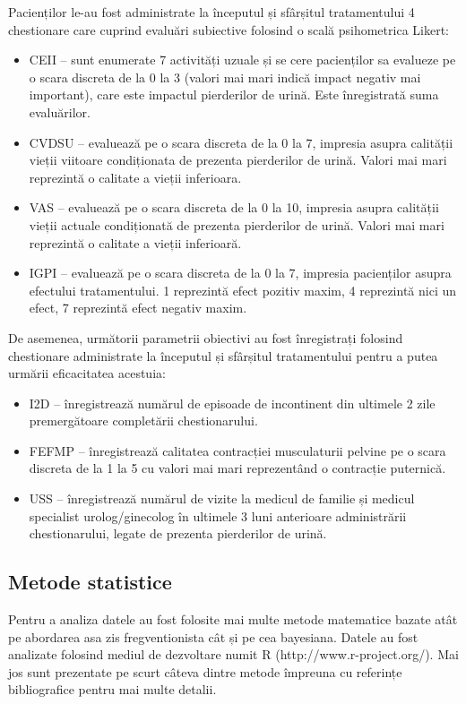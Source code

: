 \documentclass[12pt]{article}
\begin{document}
  Pacienților le-au fost administrate la începutul și sfârșitul tratamentului 4 chestionare care cuprind evaluări subiective folosind o scală psihometrica Likert:
  \begin{itemize}
    \item \ac{CEII} -- sunt enumerate 7 activități uzuale și se cere pacienților sa evalueze pe o scara discreta de la 0 la 3 (valori mai mari indică impact negativ mai important), care este impactul pierderilor de urină. Este înregistrată suma evaluărilor.
    \item \ac{CVDSU} -- evaluează pe o scara discreta de la 0 la 7, impresia asupra calității vieții viitoare condiționata de prezenta pierderilor de urină. Valori mai mari reprezintă o calitate a vieții inferioara.
    \item \ac{VAS} -- evaluează pe o scara discreta de la 0 la 10, impresia asupra calității vieții actuale condiționată de prezenta pierderilor de urină. Valori mai mari reprezintă o calitate a vieții inferioară.
    \item \ac{IGPI} -- evaluează pe o scara discreta de la 0 la 7, impresia pacienților asupra efectului tratamentului. 1 reprezintă efect pozitiv maxim, 4 reprezintă nici un efect, 7 reprezintă efect negativ maxim.
  \end{itemize}
  De asemenea, următorii parametrii obiectivi au fost înregistrați folosind chestionare administrate la începutul și sfârșitul tratamentului pentru a putea urmării eficacitatea acestuia:
  \begin{itemize}
    \item I2D -- înregistrează numărul de episoade de incontinent din ultimele 2 zile premergătoare completării chestionarului. 
    \item \ac{FEFMP} -- înregistrează calitatea contracției musculaturii pelvine pe o scara discreta de la 1 la 5 cu valori mai mari reprezentând o contracție puternică. 
    \item \ac{USS} -- înregistrează numărul de vizite la medicul de familie și medicul specialist urolog/ginecolog în ultimele 3 luni anterioare administrării chestionarului, legate de prezenta pierderilor de urină.
  \end{itemize}

\subsection{Metode statistice}
  Pentru a analiza datele au fost folosite mai multe metode matematice bazate atât pe abordarea asa zis fregventionista cât și pe cea bayesiana. Datele au fost analizate folosind mediul de dezvoltare numit R (http://www.r-project.org/). Mai jos sunt prezentate pe scurt câteva dintre metode împreuna cu referințe bibliografice pentru mai multe detalii.
\end{document}
